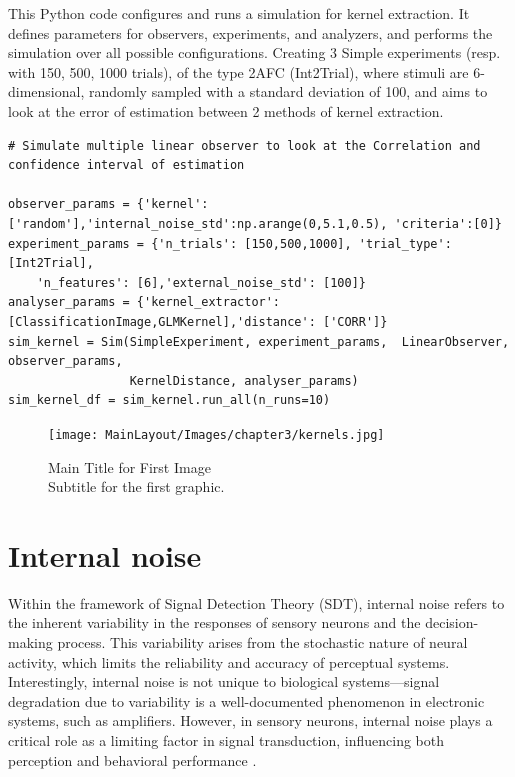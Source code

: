 \begin{tcolorbox}[title=Palin Toolbox: Kernel estimation error,
    colback=white!30!white, colframe=blue!80!white]
This Python code configures and runs a simulation for kernel extraction. It defines parameters for observers, experiments, and analyzers, and performs the simulation over all possible configurations. Creating 3 Simple experiments (resp. with 150, 500, 1000 trials), of the type 2AFC (Int2Trial), where stimuli are 6-dimensional, randomly sampled with a standard deviation of 100, and aims to look at the error of estimation between 2 methods of kernel extraction.
\tcblower

\begin{verbatim}
# Simulate multiple linear observer to look at the Correlation and confidence interval of estimation

observer_params = {'kernel':['random'],'internal_noise_std':np.arange(0,5.1,0.5), 'criteria':[0]}
experiment_params = {'n_trials': [150,500,1000], 'trial_type': [Int2Trial], 
    'n_features': [6],'external_noise_std': [100]}
analyser_params = {'kernel_extractor': [ClassificationImage,GLMKernel],'distance': ['CORR']}
sim_kernel = Sim(SimpleExperiment, experiment_params,  LinearObserver, observer_params, 
                 KernelDistance, analyser_params)
sim_kernel_df = sim_kernel.run_all(n_runs=10)
\end{verbatim}
\end{tcolorbox}
\begin{figure}[ht!]
    \centering
    \texttt{[image: MainLayout/Images/chapter3/kernels.jpg]}
    \caption{Main Title for First Image \\ \small Subtitle for the first graphic.}
    \label{fig:kernels}
\end{figure}

\section {Internal noise}
Within the framework of Signal Detection Theory (SDT), internal noise refers to the inherent variability in the responses of sensory neurons and the decision-making process. This variability arises from the stochastic nature of neural activity, which limits the reliability and accuracy of perceptual systems. Interestingly, internal noise is not unique to biological systems—signal degradation due to variability is a well-documented phenomenon in electronic systems, such as amplifiers. However, in sensory neurons, internal noise plays a critical role as a limiting factor in signal transduction, influencing both perception and behavioral performance \cite{faisal_noise_2008}.


